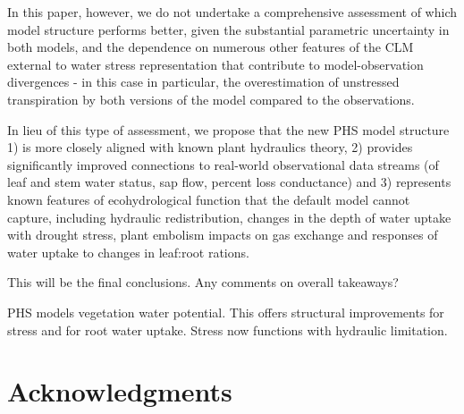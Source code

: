 \documentclass[draft,linenumbers]{agujournal}
\begin{document}
    In this paper, however, we do not undertake a comprehensive assessment of which model structure performs better, given the substantial parametric uncertainty in both models, and the dependence on numerous other features of the CLM external to water stress representation that contribute to model-observation divergences - in this case in particular, the overestimation of unstressed transpiration by both versions of the model compared to the observations. 
    
    In lieu of this type of assessment, we propose that the new PHS model structure 1) is more closely aligned with known plant hydraulics theory, 2) provides significantly improved connections to real-world observational data streams (of leaf and stem water status, sap flow, percent loss conductance) and 3) represents known features of ecohydrological function that the default model cannot capture, including hydraulic redistribution, changes in the depth of water uptake with drought stress, plant embolism impacts on gas exchange and responses of water uptake to changes in leaf:root rations. 
    
   
    This will be the final conclusions.
    Any comments on overall takeaways?

    PHS models vegetation water potential. 
    This offers structural improvements for stress and for root water uptake.
    Stress now functions with hydraulic limitation.
    
    

\section{Acknowledgments}

\clearpage    
\end{document}
